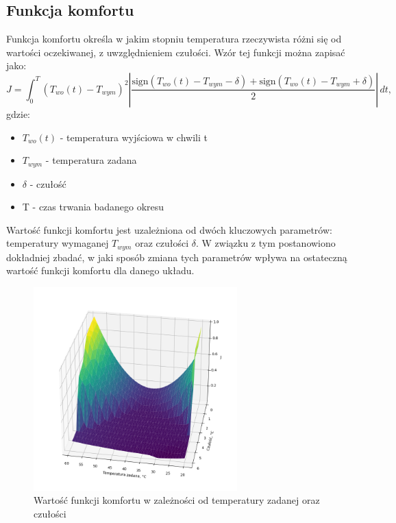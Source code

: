 \documentclass[a4paper,twoside,12pt]{book}
\begin{document}
\newpage
\subsection*{Funkcja komfortu}
Funkcja komfortu określa w jakim stopniu temperatura rzeczywista różni się od wartości oczekiwanej, z uwzględnieniem czułości. Wzór tej funkcji można zapisać jako:
\begin{equation}
  J = \int_{0}^{T} \left( T_{wo}(t) - T_{wym} \right)^2 \left| \frac{\text{sign}(T_{wo}(t) - T_{wym} - \delta) + \text{sign}(T_{wo}(t) - T_{wym} + \delta)}{2} \right| \, dt,
\end{equation}
gdzie:
\begin{itemize}
  \item $T_{wo}(t)$ - temperatura wyjściowa w chwili t
  \item $T_{wym}$ - temperatura zadana
  \item $\delta$ - czułość
  \item T - czas trwania badanego okresu
\end{itemize}

Wartość funkcji komfortu jest uzależniona od dwóch kluczowych parametrów: temperatury wymaganej $T_{wym}$ oraz czułości $\delta$. W związku z tym postanowiono dokładniej zbadać, w jaki sposób zmiana tych parametrów wpływa na ostateczną wartość funkcji komfortu dla danego układu.

\begin{figure}[!h]
  \centering
  \includegraphics[width=0.7\textwidth]{img/J_3d.png}
  \caption{Wartość funkcji komfortu w zależności od temperatury zadanej oraz czułości}
  \label{fig:J_T_D}
\end{figure}
\end{document}
